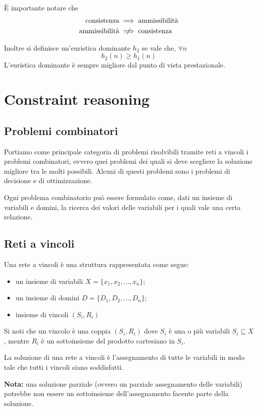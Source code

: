 \documentclass[a4paper, 11pt]{article}
\begin{document}
È importante notare che 
\begin{align*} 
	\text{consistenza} &\implies \text{ammissibilità} \\ 
	\text{ammissibilità} &\centernot\implies \text{consistenza}  
\end{align*}

Inoltre si definisce un'euristica dominante $h_2$ se vale che, $\forall n$ \[ h_2(n) \geq h_1(n) \]
L'euristica dominante è sempre migliore dal punto di vista prestazionale.

\newpage
\section{Constraint reasoning}
\subsection{Problemi combinatori}
Portiamo come principale categoria di problemi risolvibili tramite reti a vincoli i problemi combinatori, ovvero quei problemi dei quali si deve scegliere la soluzione migliore tra le molti possibili.
Alcuni di questi problemi sono i problemi di decisione e di ottimizzazione.

Ogni problema combinatorio può essere formulato come, dati un insieme di variabili e domini, la ricerca dei valori delle variabili per i quali vale una certa relazione.

\subsection{Reti a vincoli}
Una rete a vincoli è una struttura rappresentata come segue: \begin{itemize}
	\item un insieme di variabili $X = \lbrace x_1, x_2, \dots, x_n \rbrace$;
	\item un insieme di domini $D = \lbrace D_1, D_2, \dots, D_n \rbrace$;
	\item insieme di vincoli $(S_i, R_i)$
	\end{itemize}
Si noti che un vincolo è una coppia $(S_i, R_i)$ dove $S_i$ è una o più variabili $S_i \subseteq X$, mentre $R_i$ è un sottoinsieme del prodotto cartesiano in $S_i$.

La soluzione di una rete a vincoli è l'assegnamento di tutte le variabili in modo tale che tutti i vincoli siano soddisfatti.

\textbf{Nota: }una soluzione parziale (ovvero un parziale assegnamento delle variabili) potrebbe non essere un sottoinsieme dell'assegnamento facente parte della soluzione.
\end{document}
